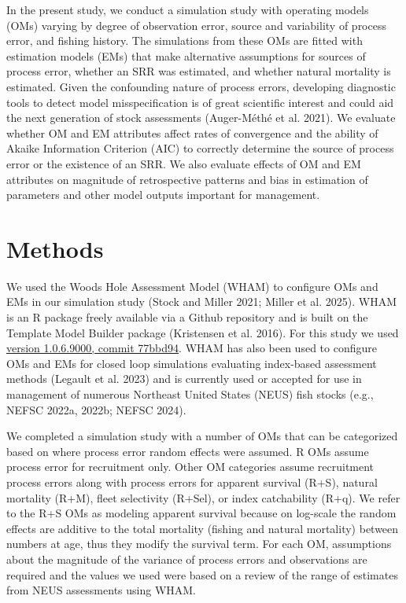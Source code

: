 \documentclass[
  12pt,
]{article}
\begin{document}
In the present study, we conduct a simulation study with operating
models (OMs) varying by degree of observation error, source and
variability of process error, and fishing history. The simulations from
these OMs are fitted with estimation models (EMs) that make alternative
assumptions for sources of process error, whether an SRR was estimated,
and whether natural mortality is estimated. Given the confounding nature
of process errors, developing diagnostic tools to detect model
misspecification is of great scientific interest and could aid the next
generation of stock assessments ({Auger-Méthé et al.} 2021). We evaluate
whether OM and EM attributes affect rates of convergence and the ability
of Akaike Information Criterion (AIC) to correctly determine the source
of process error or the existence of an SRR. We also evaluate effects of
OM and EM attributes on magnitude of retrospective patterns and bias in
estimation of parameters and other model outputs important for
management.

\section*{Methods}\label{methods}

We used the Woods Hole Assessment Model (WHAM) to configure OMs and EMs
in our simulation study (Stock and Miller 2021; Miller et al. 2025).
WHAM is an R package freely available via a Github repository and is
built on the Template Model Builder package (Kristensen et al. 2016).
For this study we used
\href{https://github.com/timjmiller/wham/tree/77bbd946e4881216a439933473d1c58b21c270c3}{version
1.0.6.9000, commit 77bbd94}. WHAM has also been used to configure OMs
and EMs for closed loop simulations evaluating index-based assessment
methods (Legault et al. 2023) and is currently used or accepted for use
in management of numerous Northeast United States (NEUS) fish stocks
(e.g., NEFSC 2022a, 2022b; NEFSC 2024).

We completed a simulation study with a number of OMs that can be
categorized based on where process error random effects were assumed. R
OMs assume process error for recruitment only. Other OM categories
assume recruitment process errors along with process errors for apparent
survival (R+S), natural mortality (R+M), fleet selectivity (R+Sel), or
index catchability (R+q). We refer to the R+S OMs as modeling apparent
survival because on log-scale the random effects are additive to the
total mortality (fishing and natural mortality) between numbers at age,
thus they modify the survival term. For each OM, assumptions about the
magnitude of the variance of process errors and observations are
required and the values we used were based on a review of the range of
estimates from NEUS assessments using WHAM.
\end{document}
